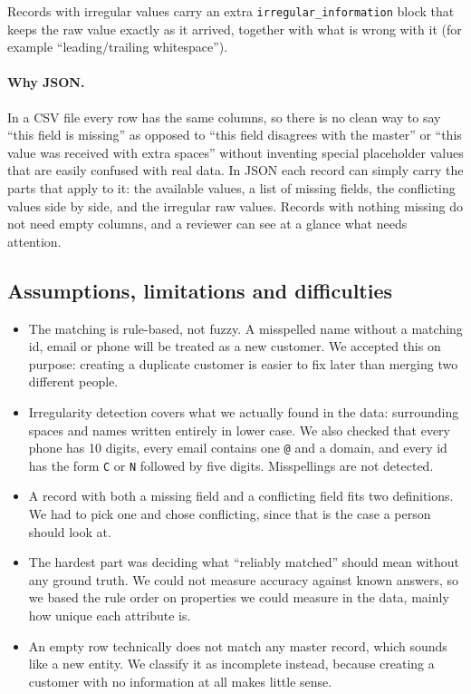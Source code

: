 \documentclass[11pt,a4paper]{article}
\newcommand{\file}[1]{\texttt{#1}}
\begin{document}
Records with irregular values carry an extra \file{irregular\_information}
block that keeps the raw value exactly as it arrived, together with what is
wrong with it (for example ``leading/trailing whitespace'').

\paragraph{Why JSON.} In a CSV file every row has the same columns, so there is
no clean way to say ``this field is missing'' as opposed to ``this field
disagrees with the master'' or ``this value was received with extra spaces''
without inventing special placeholder values that are easily confused with
real data. In JSON each record can simply carry the parts that apply to it: the
available values, a list of missing fields, the conflicting values side by
side, and the irregular raw values. Records with nothing missing do not need
empty columns, and a reviewer can see at a glance what needs attention.

\subsection{Assumptions, limitations and difficulties}

\begin{itemize}
\item The matching is rule-based, not fuzzy. A misspelled name without a
matching id, email or phone will be treated as a new customer. We accepted
this on purpose: creating a duplicate customer is easier to fix later than
merging two different people.
\item Irregularity detection covers what we actually found in the data:
surrounding spaces and names written entirely in lower case. We also checked
that every phone has 10 digits, every email contains one \file{@} and a domain,
and every id has the form \file{C} or \file{N} followed by five digits.
Misspellings are not detected.
\item A record with both a missing field and a conflicting field fits two
definitions. We had to pick one and chose conflicting, since that is the case
a person should look at.
\item The hardest part was deciding what ``reliably matched'' should mean
without any ground truth. We could not measure accuracy against known
answers, so we based the rule order on properties we could measure in the
data, mainly how unique each attribute is.
\item An empty row technically does not match any master record, which sounds
like a new entity. We classify it as incomplete instead, because creating a
customer with no information at all makes little sense.
\end{itemize}
\end{document}
